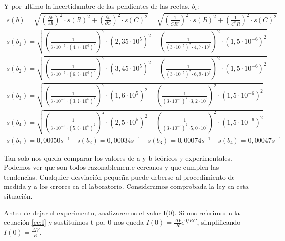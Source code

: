 \documentclass[12pt, a4paper, titlepage]{article}
\begin{document}
  Y por último la incertidumbre de las pendientes de las rectas, $b_i$:
  \begin{gather}
    s(b) = \sqrt{\left(\frac{\partial b}{\partial R}\right)^2 \cdot s(R)^2 + \left(\frac{\partial b}{\partial C}\right)^2 \cdot s(C)^2} = \sqrt{\left(\frac{1}{C R^2}\right)^2 \cdot s(R)^2 + \left(\frac{1}{C^2 R}\right)^2 \cdot s(C)^2} \\
    s(b_1) = \sqrt{\left(\frac{1}{3 \cdot 10^{-5} \cdot (4,7 \cdot 10^6)^2}\right)^2 \cdot (2,35 \cdot 10^5)^2 + \left(\frac{1}{(3 \cdot 10^{-5})^2 \cdot 4,7 \cdot 10^6}\right)^2 \cdot (1,5 \cdot 10^{-6})^2} \nonumber \\
    s(b_2) = \sqrt{\left(\frac{1}{3 \cdot 10^{-5} \cdot (6,9 \cdot 10^6)^2}\right)^2 \cdot (3,45 \cdot 10^5)^2 + \left(\frac{1}{(3 \cdot 10^{-5})^2 \cdot 6,9 \cdot 10^6}\right)^2 \cdot (1,5 \cdot 10^{-6})^2} \nonumber \\
    s(b_3) = \sqrt{\left(\frac{1}{3 \cdot 10^{-5} \cdot (3,2 \cdot 10^6)^2}\right)^2 \cdot (1,6 \cdot 10^5)^2 + \left(\frac{1}{(3 \cdot 10^{-5})^2 \cdot 3,2 \cdot 10^6}\right)^2 \cdot (1,5 \cdot 10^{-6})^2} \nonumber \\
    s(b_4) = \sqrt{\left(\frac{1}{3 \cdot 10^{-5} \cdot (5,0 \cdot 10^6)^2}\right)^2 \cdot (2,5 \cdot 10^5)^2 + \left(\frac{1}{(3 \cdot 10^{-5})^2 \cdot 5,0 \cdot 10^6}\right)^2 \cdot (1,5 \cdot 10^{-6})^2} \nonumber \\
    s(b_1) = 0,00050 s^{-1} \quad s(b_2) = 0,00034 s^{-1} \quad s(b_3) = 0,00074 s^{-1} \quad s(b_4) = 0,00047 s^{-1} \nonumber
  \end{gather}

  Tan solo nos queda comparar los valores de a y b teóricos y experimentales. Podemos ver que son todos razonablemente cercanos y que cumplen las tendencias. Cualquier desviación pequeña puede deberse al procedimiento de medida y a los errores en el laboratorio. Consideramos comprobada la ley en esta situación.

  Antes de dejar el experimento, analizaremos el valor I(0). Si nos referimos a la ecuación \ref{ec:I} y sustituímos t por 0 nos queda $I(0) = \frac{\Delta V}{R}e^{0/RC}$, simplificando $I(0) = \frac{\Delta V}{R}$.
\end{document}
